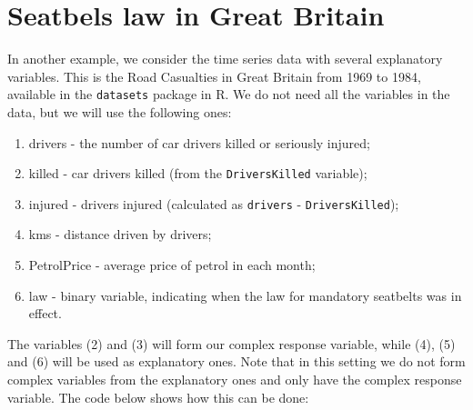 \documentclass[
]{book}
\providecommand{\tightlist}{%
  \setlength{\itemsep}{0pt}\setlength{\parskip}{0pt}}
\begin{document}
\hypertarget{seatbels-law-in-great-britain}{%
\section{Seatbels law in Great Britain}\label{seatbels-law-in-great-britain}}

In another example, we consider the time series data with several explanatory variables. This is the Road Casualties in Great Britain from 1969 to 1984, available in the \texttt{datasets} package in R. We do not need all the variables in the data, but we will use the following ones:

\begin{enumerate}
\def\labelenumi{\arabic{enumi}.}
\tightlist
\item
  drivers - the number of car drivers killed or seriously injured;
\item
  killed - car drivers killed (from the \texttt{DriversKilled} variable);
\item
  injured - drivers injured (calculated as \texttt{drivers} - \texttt{DriversKilled});
\item
  kms - distance driven by drivers;
\item
  PetrolPrice - average price of petrol in each month;
\item
  law - binary variable, indicating when the law for mandatory seatbelts was in effect.
\end{enumerate}

The variables (2) and (3) will form our complex response variable, while (4), (5) and (6) will be used as explanatory ones. Note that in this setting we do not form complex variables from the explanatory ones and only have the complex response variable. The code below shows how this can be done:
\end{document}
